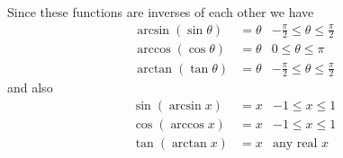 Since these functions are inverses of each other we have
\begin{align*}
  \arcsin(\sin \theta) &= \theta & -\frac{\pi}{2} \leq \theta \leq \frac{\pi}{2} \\
  \arccos(\cos \theta) &= \theta & 0 \leq \theta \leq \pi \\
  \arctan(\tan \theta) &= \theta & -\frac{\pi}{2} \leq \theta \leq \frac{\pi}{2}	
\end{align*}
and also
\begin{align*}
  \sin(\arcsin x) &= x & -1 \leq x \leq 1 \\
  \cos(\arccos x) &= x & -1 \leq x \leq 1 \\
  \tan(\arctan x) &= x & \text{any real $x$}
\end{align*}

